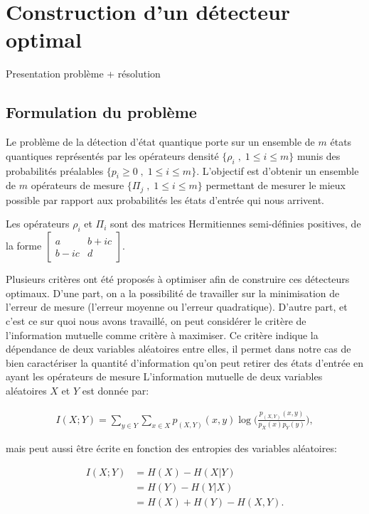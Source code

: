 \chapter{Construction d'un détecteur optimal}

Presentation problème + résolution

\section{Formulation du problème}
Le problème de la détection d'état quantique porte sur un ensemble de $m$ états quantiques représentés par les opérateurs densité $\{\rho_i \; , \; 1 \leq i \leq m\}$ munis des probabilités préalables $\{p_i \geq 0 \; , \; 1 \leq i \leq m \}$. L'objectif est d'obtenir un ensemble de $m$ opérateurs de mesure $\{\Pi_j \; , \; 1 \leq i \leq m\}$ permettant de mesurer le mieux possible par rapport aux probabilités les états d'entrée qui nous arrivent.

Les opérateurs $\rho_i$ et $\Pi_i$ sont des matrices Hermitiennes semi-définies positives, de la forme $\begin{bmatrix}a & b+ic \\ b-ic & d \end{bmatrix}$.


Plusieurs critères ont été proposés à optimiser afin de construire ces détecteurs optimaux. D'une part, on a la possibilité de travailler sur la minimisation de l'erreur de mesure (l'erreur moyenne ou l'erreur quadratique). D'autre part, et c'est ce sur quoi nous avons travaillé, on peut considérer le critère de l'information mutuelle comme critère à maximiser. Ce critère indique la dépendance de deux variables aléatoires entre elles, il permet dans notre cas de bien caractériser la quantité d'information qu'on peut retirer des états d'entrée en ayant les opérateurs de mesure
\medbreak
L'information mutuelle de deux variables aléatoires $X$ et $Y$ est donnée par:

\begin{align}
    I(X;Y) = \displaystyle \sum_{y \in Y} \displaystyle \sum_{x \in X} p_{(X, Y)}(x, y) \log \big(\frac{p_{(X, Y)}(x, y)}{p_X(x) p_Y(y)}\big),
\end{align}

mais peut aussi être écrite en fonction des entropies des variables aléatoires:

\begin{align}
    I(X; Y) &= H(X) - H(X | Y) \\
            &= H(Y) - H(Y | X) \\
            &= H(X) + H(Y) - H(X, Y).
\end{align}

